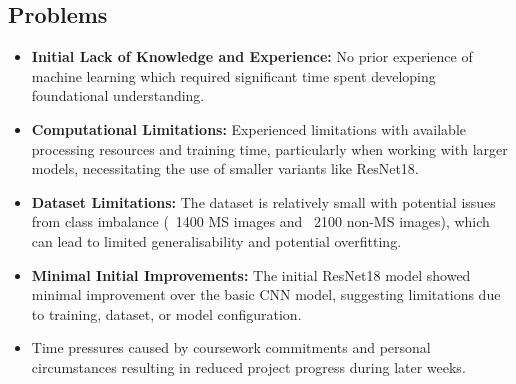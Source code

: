 \documentclass[11pt]{article}
\begin{document}
\subsection*{Problems}\label{problems}
\begin{itemize}
    \tightlist
    \item \textbf{Initial Lack of Knowledge and Experience:} No prior experience of machine learning which required significant time spent developing foundational understanding.
    \item \textbf{Computational Limitations:} Experienced limitations with available processing resources and training time, particularly when working with larger models, necessitating the use of smaller variants like ResNet18.
    \item \textbf{Dataset Limitations:} The dataset is relatively small with potential issues from class imbalance (~1400 MS images and ~2100 non-MS images), which can lead to limited generalisability and potential overfitting.
    \item \textbf{Minimal Initial Improvements:} The initial ResNet18 model showed minimal improvement over the basic CNN model, suggesting limitations due to training, dataset, or model configuration.
    \item Time pressures caused by coursework commitments and personal circumstances resulting in reduced project progress during later weeks.
\end{itemize}
\end{document}
